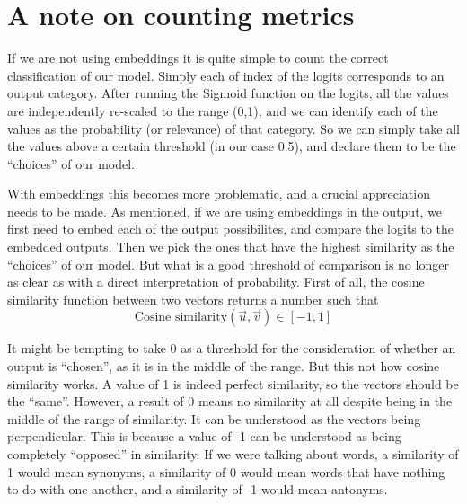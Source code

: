 \documentclass[a4paper, 11pt]{report}
\begin{document}
    \section{A note on counting metrics}\label{Apx: A note on counting metrics}
    If we are not using embeddings it is quite simple to count the correct classification of our model. Simply each of index of the logits corresponds to an output category. After running the Sigmoid function on the logits, all the values are independently re-scaled to the range (0,1), and we can identify each of the values as the probability (or relevance) of that category. So we can simply take all the values above a certain threshold (in our case 0.5), and declare them to be the ``choices'' of our model.

    With embeddings this becomes more problematic, and a crucial appreciation needs to be made. As mentioned, if we are using embeddings in the output, we first need to embed each of the output possibilites, and compare the logits to the embedded outputs. Then we pick the ones that have the highest similarity as the ``choices'' of our model. But what is a good threshold of comparison is no longer as clear as with a direct interpretation of probability. First of all, the cosine similarity function between two vectors returns a number such that
    $$
    \text{Cosine similarity}\left(\vec{u},\vec{v}\right) \in [-1, 1]
    $$

    It might be tempting to take 0 as a threshold for the consideration of whether an output is ``chosen'', as it is in the middle of the range. But this not how cosine similarity works.  A value of 1 is indeed perfect similarity, so the vectors should be the ``same''. However, a  result of 0 means no similarity at all despite being in the middle of the range of similarity. It can be understood as the vectors being perpendicular. This is because a value of -1 can be understood as being completely ``opposed'' in similarity. If we were talking about words, a similarity of 1 would mean synonyms, a similarity of 0 would mean words that have nothing to do with one another, and a similarity of -1 would mean antonyms.
\end{document}
